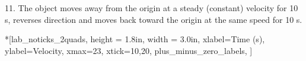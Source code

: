 11. The object moves away from the origin at a steady (constant) velocity for
10 s, reverses direction and moves back toward the origin at the same speed
for 10 s.

\begin{lab_axis}*[lab_noticks_2quads,
	height = {1.8in}, width = {3.0in},
	xlabel={Time (s)},
	ylabel={Velocity},
	xmax=23,
	xtick={10,20},
	plus_minus_zero_labels,
	]
\end{lab_axis}


